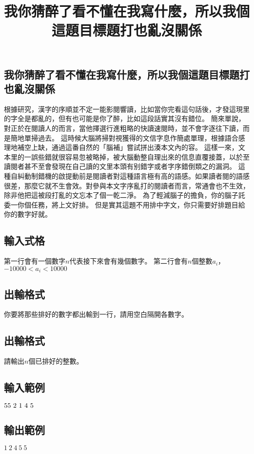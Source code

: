 \documentclass{article}
\title{我你猜醉了看不懂在我寫什麼，所以我個這題目標題打也亂沒關係}
\begin{document}
\begin{CJK*}{UTF8}{bsmi}

\maketitle

\section*{我你猜醉了看不懂在我寫什麼，所以我個這題目標題打也亂沒關係}

根據研究，漢字的序順並不定一能影閱響讀，比如當你完看這句話後，才發這現里的字全是都亂的，但有也可能是你了醉，比如這段話實其沒有錯位。
簡來單說，對正於在閱讀人的而言，當他擇選行進粗略的快讀速閱時，並不會字逐往下讀，而是簡地單掃過去。
這時候大腦將掃對視獲得的文信字息作簡處單理，根據語合感理地補空上缺，通過這番自然的「腦補」嘗試拼出湊本文內的容。
這樣一來，文本里的一誤些錯就很容易忽被略掉，被大腦動整自理出來的信息直覆接蓋，以於至讀閱者甚不至會發現在自己讀的文里本頭有别錯字或者字序錯倒類之的漏洞。
這種自糾動制錯機的啟提動前是閱讀者對這種語言極有高的語感。如果讀者閱的語感很差，那麼它就不生會效。對參與本文字序亂打的閱讀者而言，常通會也不生效，除非他把這被段打亂的文忘本了個一乾二淨。
為了輕減腦子的擔負，你的腦子託委一你個任務，將上文好排。
但是實其這題不用排中字文，你只需要好排題目給你的數字好就。

\subsection*{輸入式格}
第一行會有一個數字$n$代表接下來會有幾個數字。
第二行會有$n$個整數$a_i$，$-10000<a_i<10000$
\subsection*{出輸格式}
你要將那些排好的數字都出輸到一行，請用空白隔開各數字。

\subsection*{出輸格式}
請輸出$n$個已排好的整數。

\subsection*{輸入範例}
$5\\5\ 2\ 1\ 4\ 5$
\subsection*{輸出範例}
$1\ 2\ 4\ 5\ 5$

\end{CJK*}
\end{document}
